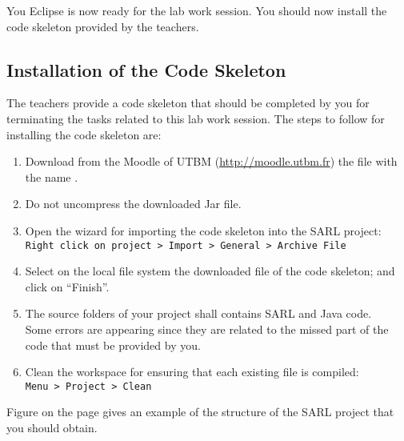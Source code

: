You Eclipse is now ready for the lab work session. You should now install the code skeleton provided by the teachers.

\subsection{Installation of the Code Skeleton}

The teachers provide a code skeleton that should be completed by you for terminating the tasks related to this lab work session.
The steps to follow for installing the code skeleton are:
\begin{enumerate}
\item Download from the Moodle of UTBM (\url{http://moodle.utbm.fr}) the file with the name \skeletonName.
\item Do not uncompress the downloaded Jar file.
\item Open the wizard for importing the code skeleton into the SARL project: \\
	\texttt{Right click on project > Import > General > Archive File}
\item Select on the local file system the downloaded file of the code skeleton; and click on ``Finish''.
\item The source folders of your project shall contains SARL and Java code. \\
	Some errors are appearing since they are related to the missed part of the code that must be provided by you. 
\item Clean the workspace for ensuring that each existing file is compiled: \\
	\texttt{Menu > Project > Clean}
\end{enumerate}

Figure  on the page  gives an example of the structure of the SARL project that you should obtain.



